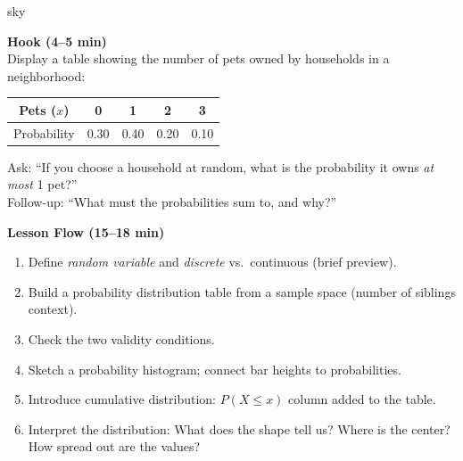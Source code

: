 \documentclass[10pt]{article}
\begin{document}
\begin{skillbox}[Hook]{sky}
\begin{minipage}[t]{0.48\linewidth}
    \textbf{Hook (4--5 min)}\\
    Display a table showing the number of pets owned by households in a neighborhood:
    \begin{center}
    \renewcommand{\arraystretch}{1.3}
    \begin{tabular}{@{}ccccc@{}}
    Pets ($x$) & 0 & 1 & 2 & 3 \\
    \hline
    Probability & 0.30 & 0.40 & 0.20 & 0.10 \\
    \end{tabular}
    \end{center}
    Ask: ``If you choose a household at random, what is the probability it owns
    \emph{at most} 1 pet?''\\[4pt]
    Follow-up: ``What must the probabilities sum to, and why?''
\end{minipage}
\hfill
\begin{minipage}[t]{0.48\linewidth}
    \textbf{Lesson Flow (15--18 min)}
    \begin{enumerate}
        \item Define \emph{random variable} and \emph{discrete} vs.\ continuous (brief preview).
        \item Build a probability distribution table from a sample space (number of siblings
              context).
        \item Check the two validity conditions.
        \item Sketch a probability histogram; connect bar heights to probabilities.
        \item Introduce cumulative distribution: $P(X \le x)$ column added to the table.
        \item Interpret the distribution: What does the shape tell us? Where is the center?
              How spread out are the values?
    \end{enumerate}
\end{minipage}
\end{skillbox}
\end{document}
